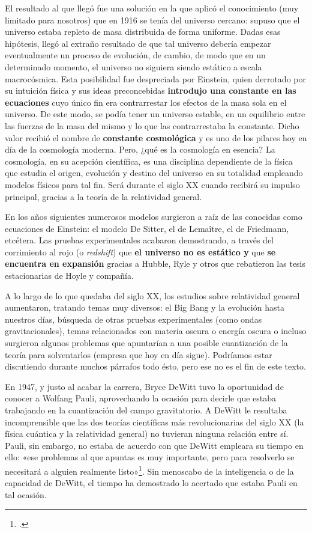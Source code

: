\documentclass[11pt,a4paper,titlepage]{article}
\begin{document}
El resultado al que llegó fue una solución en la que aplicó el conocimiento (muy limitado para nosotros) que en 1916 se tenía del universo cercano: supuso que el universo estaba repleto de masa distribuida de forma uniforme. Dadas esas hipótesis, llegó al extraño resultado de que tal universo debería empezar eventualmente un proceso de evolución, de cambio, de modo que en un determinado momento, el universo no siguiera siendo estático a escala macrocósmica. Esta posibilidad fue despreciada por Einstein, quien derrotado por su intuición física y sus ideas preconcebidas \textbf{introdujo una constante en las ecuaciones} cuyo único fin era contrarrestar los efectos de la masa sola en el universo. De este modo, se podía tener un universo estable, en un equilibrio entre las fuerzas de la masa del mismo y lo que las contrarrestaba la constante. Dicho valor recibió el nombre de \textbf{constante cosmológica} y es uno de los pilares hoy en día de la cosmología moderna. Pero, ¿qué es la cosmología en esencia? La cosmología, en su acepción científica, es una disciplina dependiente de la física que estudia el origen, evolución y destino del universo en su totalidad empleando modelos físicos para tal fin. Será durante el siglo XX cuando recibirá su impulso principal, gracias a la teoría de la relatividad general.

En los años siguientes numerosos modelos surgieron a raíz de las conocidas como ecuaciones de Einstein: el modelo De Sitter, el de Lemaître, el de Friedmann, etcétera. Las pruebas experimentales acabaron demostrando, a través del corrimiento al rojo (o \textit{redshift}) que \textbf{el universo no es estático y} que \textbf{se encuentra en expansión} gracias a Hubble, Ryle y otros que rebatieron las tesis estacionarias de Hoyle y compañía.

A lo largo de lo que quedaba del siglo XX, los estudios sobre relatividad general aumentaron, tratando temas muy diversos: el Big Bang y la evolución hasta nuestros días, búsqueda de otras pruebas experimentales (como ondas gravitacionales), temas relacionados con materia oscura o energía oscura o incluso surgieron algunos problemas que apuntarían a una posible cuantización de la teoría para solventarlos (empresa que hoy en día sigue). Podríamos estar discutiendo durante muchos párrafos todo ésto, pero ese no es el fin de este texto.

En 1947, y justo al acabar la carrera, Bryce DeWitt tuvo la oportunidad de conocer a Wolfang Pauli, aprovechando la ocasión para decirle que estaba trabajando en la cuantización del campo gravitatorio. A DeWitt le resultaba incomprensible que las dos teorías científicas más revolucionarias del siglo XX (la física cuántica y la relatividad general) no tuvieran ninguna relación entre sí. Pauli, sin embargo, no estaba de acuerdo con que DeWitt empleara su tiempo en ello: «ese problemas al que apuntas es muy importante, pero para resolverlo se necesitará a alguien realmente listo»\footnote{\cite[p.~230]{teoriaperfecta}.}. Sin menoscabo de la inteligencia o de la capacidad de DeWitt, el tiempo ha demostrado lo acertado que estaba Pauli en tal ocasión.
\end{document}
